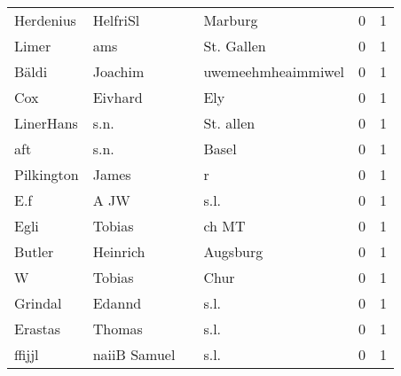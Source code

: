 \begin{tabular}{llllrr}
                Herdenius &                           HelfriSl &             &                                     Marburg &          0 &         1 \\
                    Limer &                                ams &             &                                  St. Gallen &          0 &         1 \\
                    Bäldi &                            Joachim &             &                          uwemeehmheaimmiwel &          0 &         1 \\
                      Cox &                            Eivhard &             &                                         Ely &          0 &         1 \\
                LinerHans &                               s.n. &             &                                   St. allen &          0 &         1 \\
                      aft &                               s.n. &             &                                       Basel &          0 &         1 \\
               Pilkington &                              James &             &                                           r &          0 &         1 \\
                      E.f &                               A JW &             &                                        s.l. &          0 &         1 \\
                     Egli &                             Tobias &             &                                       ch MT &          0 &         1 \\
                   Butler &                           Heinrich &             &                                    Augsburg &          0 &         1 \\
                        W &                             Tobias &             &                                        Chur &          0 &         1 \\
                  Grindal &                             Edannd &             &                                        s.l. &          0 &         1 \\
                  Erastas &                             Thomas &             &                                        s.l. &          0 &         1 \\
                   ffijjl &                       naiiB Samuel &             &                                        s.l. &          0 &         1 \\

\end{tabular}

